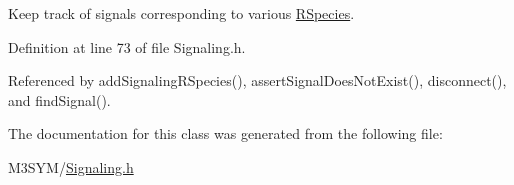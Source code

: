 Keep track of signals corresponding to various \hyperlink{classRSpecies}{R\+Species}. 



Definition at line 73 of file Signaling.\+h.



Referenced by add\+Signaling\+R\+Species(), assert\+Signal\+Does\+Not\+Exist(), disconnect(), and find\+Signal().



The documentation for this class was generated from the following file\+:\begin{DoxyCompactItemize}
\item 
M3\+S\+Y\+M/\hyperlink{Signaling_8h}{Signaling.\+h}\end{DoxyCompactItemize}
